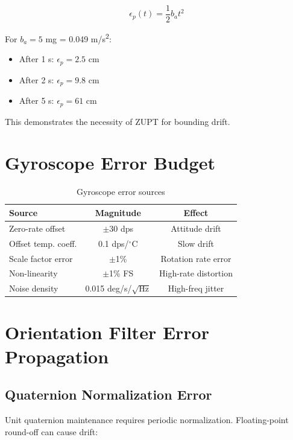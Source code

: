 \begin{equation}
    \epsilon_p(t) = \frac{1}{2} b_a t^2
\end{equation}

For $b_a = 5$ mg = 0.049 m/s\textsuperscript{2}:
\begin{itemize}
    \item After 1 s: $\epsilon_p = 2.5$ cm
    \item After 2 s: $\epsilon_p = 9.8$ cm
    \item After 5 s: $\epsilon_p = 61$ cm
\end{itemize}

This demonstrates the necessity of ZUPT for bounding drift.

\section{Gyroscope Error Budget}

\begin{table}[h]
    \centering
    \caption{Gyroscope error sources}
    \label{tab:gyro_error}
    \begin{tabular}{lcc}
        \toprule
        \textbf{Source} & \textbf{Magnitude} & \textbf{Effect} \\
        \midrule
        Zero-rate offset & $\pm$30 dps & Attitude drift \\
        Offset temp. coeff. & 0.1 dps/$^\circ$C & Slow drift \\
        Scale factor error & $\pm$1\% & Rotation rate error \\
        Non-linearity & $\pm$1\% FS & High-rate distortion \\
        Noise density & 0.015 deg/s/$\sqrt{\text{Hz}}$ & High-freq jitter \\
        \bottomrule
    \end{tabular}
\end{table}

\section{Orientation Filter Error Propagation}

\subsection{Quaternion Normalization Error}

Unit quaternion maintenance requires periodic normalization. Floating-point round-off can cause drift:

